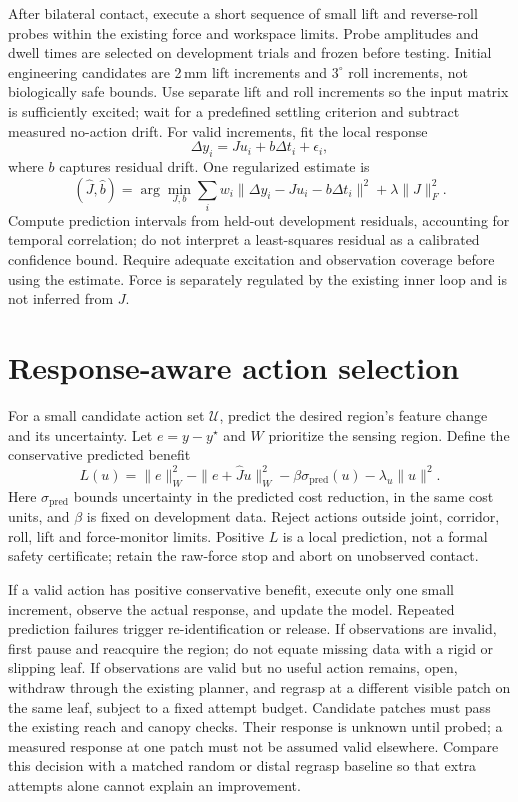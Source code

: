 \documentclass[letterpaper,10pt,conference]{ieeeconf}
\begin{document}
After bilateral contact, execute a short sequence of small lift and reverse-roll probes
within the existing force and workspace limits. Probe amplitudes and dwell times are
selected on development trials and frozen before testing. Initial engineering candidates
are 2\,mm lift increments and $3^\circ$ roll increments, not biologically safe bounds.
Use separate lift and roll increments so the input matrix is sufficiently excited; wait
for a predefined settling criterion and subtract measured no-action drift. For valid
increments, fit the local response
\begin{equation}
 \Delta y_i = J u_i + b\Delta t_i + \epsilon_i,
\end{equation}
where $b$ captures residual drift. One regularized estimate is
\begin{equation}
 (\widehat J,\widehat b)=\arg\min_{J,b}
 \sum_i w_i\|\Delta y_i-Ju_i-b\Delta t_i\|^2
 +\lambda\|J\|_F^2.
\end{equation}
Compute prediction intervals from held-out development residuals, accounting for temporal
correlation; do not interpret a least-squares residual as a calibrated confidence bound.
Require adequate excitation and observation coverage before using the estimate. Force
is separately regulated by the existing inner loop and is not inferred from $J$.

\section{Response-aware action selection}
For a small candidate action set $\mathcal U$, predict the desired region's feature
change and its uncertainty. Let $e=y-y^\star$ and $W$ prioritize the sensing region.
Define the conservative predicted benefit
\begin{equation}
 L(u)=\|e\|_W^2-\|e+\widehat Ju\|_W^2
       -\beta\sigma_{\mathrm{pred}}(u)-\lambda_u\|u\|^2.
\end{equation}
Here $\sigma_{\mathrm{pred}}$ bounds uncertainty in the predicted cost reduction, in
the same cost units, and $\beta$ is fixed on development data. Reject actions outside
joint, corridor, roll, lift and force-monitor limits. Positive $L$ is a local prediction,
not a formal safety certificate; retain the raw-force stop and abort on unobserved contact.

If a valid action has positive conservative benefit, execute only one small increment,
observe the actual response, and update the model. Repeated prediction failures trigger
re-identification or release. If observations are invalid, first pause and reacquire the
region; do not equate missing data with a rigid or slipping leaf. If observations are
valid but no useful action remains, open, withdraw through the existing planner, and
regrasp at a different visible patch on the same leaf, subject to a fixed attempt budget.
Candidate patches must pass the existing reach and canopy checks. Their response is
unknown until probed; a measured response at one patch must not be assumed valid elsewhere.
Compare this decision with a matched random or distal regrasp baseline so that extra
attempts alone cannot explain an improvement.
\end{document}
